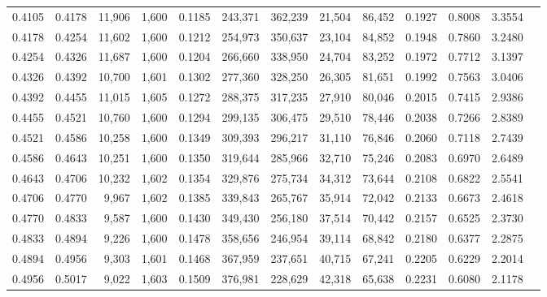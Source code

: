 \begin{tabular}{rrrrrrrrrrrrr}
0.4105 & 0.4178 & 11,906 & 1,600 &                                     0.1185 & 243,371 & 362,239 &  21,504 &  86,452 & 0.1927 & 0.8008 & 3.3554 \\
0.4178 & 0.4254 & 11,602 & 1,600 &                                     0.1212 & 254,973 & 350,637 &  23,104 &  84,852 & 0.1948 & 0.7860 & 3.2480 \\
0.4254 & 0.4326 & 11,687 & 1,600 &                                     0.1204 & 266,660 & 338,950 &  24,704 &  83,252 & 0.1972 & 0.7712 & 3.1397 \\
0.4326 & 0.4392 & 10,700 & 1,601 &                                     0.1302 & 277,360 & 328,250 &  26,305 &  81,651 & 0.1992 & 0.7563 & 3.0406 \\
0.4392 & 0.4455 & 11,015 & 1,605 &                                     0.1272 & 288,375 & 317,235 &  27,910 &  80,046 & 0.2015 & 0.7415 & 2.9386 \\
0.4455 & 0.4521 & 10,760 & 1,600 &                                     0.1294 & 299,135 & 306,475 &  29,510 &  78,446 & 0.2038 & 0.7266 & 2.8389 \\
0.4521 & 0.4586 & 10,258 & 1,600 &                                     0.1349 & 309,393 & 296,217 &  31,110 &  76,846 & 0.2060 & 0.7118 & 2.7439 \\
0.4586 & 0.4643 & 10,251 & 1,600 &                                     0.1350 & 319,644 & 285,966 &  32,710 &  75,246 & 0.2083 & 0.6970 & 2.6489 \\
0.4643 & 0.4706 & 10,232 & 1,602 &                                     0.1354 & 329,876 & 275,734 &  34,312 &  73,644 & 0.2108 & 0.6822 & 2.5541 \\
0.4706 & 0.4770 &  9,967 & 1,602 &                                     0.1385 & 339,843 & 265,767 &  35,914 &  72,042 & 0.2133 & 0.6673 & 2.4618 \\
0.4770 & 0.4833 &  9,587 & 1,600 &                                     0.1430 & 349,430 & 256,180 &  37,514 &  70,442 & 0.2157 & 0.6525 & 2.3730 \\
0.4833 & 0.4894 &  9,226 & 1,600 &                                     0.1478 & 358,656 & 246,954 &  39,114 &  68,842 & 0.2180 & 0.6377 & 2.2875 \\
0.4894 & 0.4956 &  9,303 & 1,601 &                                     0.1468 & 367,959 & 237,651 &  40,715 &  67,241 & 0.2205 & 0.6229 & 2.2014 \\
0.4956 & 0.5017 &  9,022 & 1,603 &                                     0.1509 & 376,981 & 228,629 &  42,318 &  65,638 & 0.2231 & 0.6080 & 2.1178 \\

\end{tabular}
